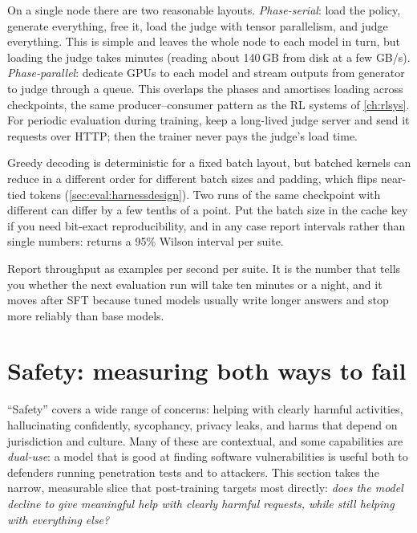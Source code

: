 \begin{systemslens}
On a single node there are two reasonable layouts. \emph{Phase-serial}: load the policy, generate
everything, free it, load the judge with tensor parallelism, and judge everything. This is
simple and leaves the whole node to each model in turn, but loading the judge takes minutes
(reading about 140\,GB from disk at a few GB/s). \emph{Phase-parallel}: dedicate GPUs to each model
and stream outputs from generator to judge through a queue. This overlaps the phases and
amortises loading across checkpoints, the same producer--consumer pattern as the RL systems
of \cref{ch:rlsys}. For periodic evaluation during training, keep a long-lived judge
server and send it requests over HTTP; then the trainer never pays the judge's load time.
\end{systemslens}

\begin{pitfall}
Greedy decoding is deterministic for a fixed batch layout, but batched kernels can reduce in a
different order for different batch sizes and padding, which flips near-tied tokens
(\cref{sec:eval:harnessdesign}). Two runs of the same checkpoint with different
 can differ by a few tenths of a point. Put the batch size in the cache key
if you need bit-exact reproducibility, and in any case report intervals rather than single
numbers:  returns a 95\% Wilson interval per suite.
\end{pitfall}

Report throughput as examples per second per suite. It is the number that tells you whether
the next evaluation run will take ten minutes or a night, and it moves after SFT because tuned
models usually write longer answers and stop more reliably than base models.

\section{Safety: measuring both ways to fail}\label{sec:align:safety}


``Safety'' covers a wide range of concerns: helping with clearly harmful activities, hallucinating
confidently, sycophancy, privacy leaks, and harms that depend on jurisdiction and culture. Many
of these are contextual, and some capabilities are \emph{dual-use}: a model that is good at
finding software vulnerabilities is useful both to defenders running penetration tests and to
attackers. This section takes the narrow, measurable slice that post-training targets most
directly: \emph{does the model decline to give meaningful help with clearly harmful requests,
while still helping with everything else?}

